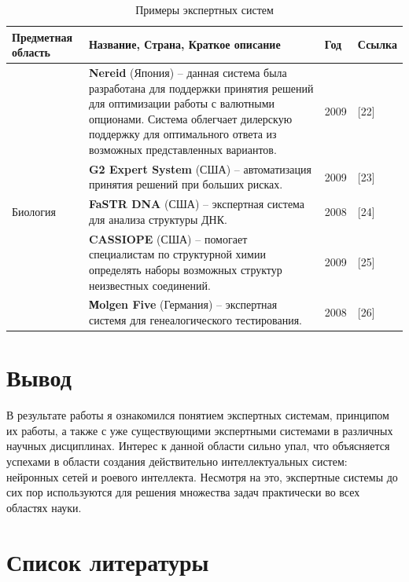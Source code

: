\documentclass[14pt,a4paper,report]{report}
\begin{document}
\clearpage

\begin{table}[h!]
	\centering
	\bgroup
	\def\arraystretch{1}
	\begin{tabular}{ | P{3cm} | P{8cm} | P{2cm} | P{2cm} | }
		\hline
		Предметная область & Название, Страна, Краткое описание & Год & Ссылка 
		\\ \hline

		 & \textbf{Nereid} (Япония) -- данная система была разработана для поддержки принятия решений для оптимизации работы с валютными опционами. Система облегчает дилерскую поддержку для оптимального ответа из возможных представленных вариантов. & 2009 & [22] \\ \hline
		 & \textbf{G2 Expert System} (США) -- автоматизация принятия решений при больших рисках. & 2009 & [23] \\ \hline
		 
		 Биология & \textbf{FaSTR DNA} (США) -- экспертная система для анализа структуры ДНК. & 2008 & [24] \\ \hline
		 & \textbf{CASSIOPE} (США) -- помогает специалистам по структурной химии определять наборы возможных структур неизвестных соединений. & 2009 & [25] \\ \hline
		 & \textbf{Мolgen Five} (Германия) -- экспертная системя для генеалогического тестирования. & 2008 & [26] \\ \hline
		
	\end{tabular}
	\egroup
	\caption{Примеры экспертных систем}
	\label{table:2}
\end{table}

\section{Вывод}

В результате работы я ознакомился понятием экспертных системам, принципом их работы, а также с уже существующими экспертными системами в различных научных дисциплинах. Интерес к данной области сильно упал, что объясняется успехами в области создания действительно интеллектуальных систем: нейронных сетей и роевого интеллекта. Несмотря на это, экспертные системы до сих пор используются для решения множества задач практически во всех областях науки.

\clearpage

\section{Список литературы}
\end{document}
